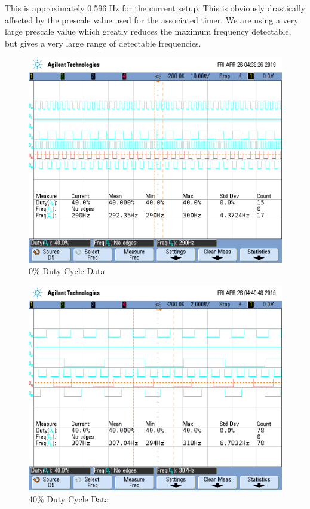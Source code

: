 \documentclass[a4paper, 12pt]{article}
\begin{document}
This is approximately 0.596 Hz for the current setup. This is obviously drastically affected by the prescale value used for the associated timer. We are using a very large prescale value which greatly reduces the maximum frequency detectable, but gives a very large range of detectable frequencies.

\begin{figure}[H]
\centering
\includegraphics[width=.8\textwidth]{scope_5.png}
\caption{0\% Duty Cycle Data}
\label{fig:data0}
\end{figure}

\begin{figure}[H]
\centering
\includegraphics[width=.8\textwidth]{scope_6.png}
\caption{40\% Duty Cycle Data}
\label{fig:data40}
\end{figure}
\end{document}
